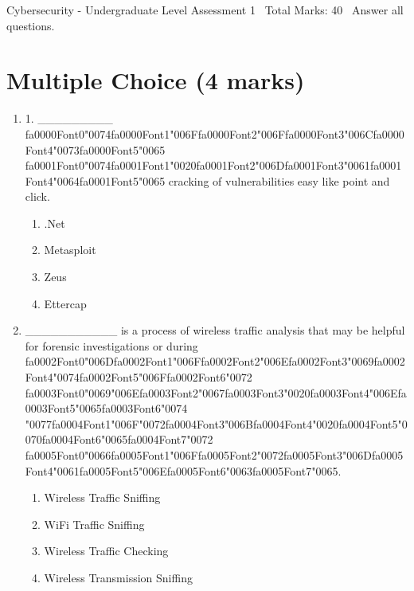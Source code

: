 \documentclass[12pt]{article}
\begin{document}
\begin{center}
Cybersecurity - Undergraduate Level Assessment 1 \
Total Marks: 40 \
Answer all questions.
\end{center}

\section*{Multiple Choice (4 marks)}
\begin{enumerate}[label=\arabic*.]
\item 1. \_\_\_\_\_\_\_\_\_ {\csname fa0000Font0\endcsname\char"0074}{\csname fa0000Font1\endcsname\char"006F}{\csname fa0000Font2\endcsname\char"006F}{\csname fa0000Font3\endcsname\char"006C}{\csname fa0000Font4\endcsname\char"0073}{\csname fa0000Font5\endcsname\char"0065} {\csname fa0001Font0\endcsname\char"0074}{\csname fa0001Font1\endcsname\char"0020}{\csname fa0001Font2\endcsname\char"006D}{\csname fa0001Font3\endcsname\char"0061}{\csname fa0001Font4\endcsname\char"0064}{\csname fa0001Font5\endcsname\char"0065} cracking of vulnerabilities easy like point and click.
\begin{enumerate}[label=(\alph*)]
    \item .Net
    \item Metasploit
    \item Zeus
    \item Ettercap
\end{enumerate}
\item \_\_\_\_\_\_\_\_\_\_\_ is a process of wireless traffic analysis that may be helpful for forensic investigations or during {\csname fa0002Font0\endcsname\char"006D}{\csname fa0002Font1\endcsname\char"006F}{\csname fa0002Font2\endcsname\char"006E}{\csname fa0002Font3\endcsname\char"0069}{\csname fa0002Font4\endcsname\char"0074}{\csname fa0002Font5\endcsname\char"006F}{\csname fa0002Font6\endcsname\char"0072} {\csname fa0003Font0\endcsname\char"0069}{\char"006E}{\csname fa0003Font2\endcsname\char"0067}{\csname fa0003Font3\endcsname\char"0020}{\csname fa0003Font4\endcsname\char"006E}{\csname fa0003Font5\endcsname\char"0065}{\csname fa0003Font6\endcsname\char"0074} {\char"0077}{\csname fa0004Font1\endcsname\char"006F}{\char"0072}{\csname fa0004Font3\endcsname\char"006B}{\csname fa0004Font4\endcsname\char"0020}{\csname fa0004Font5\endcsname\char"0070}{\csname fa0004Font6\endcsname\char"0065}{\csname fa0004Font7\endcsname\char"0072} {\csname fa0005Font0\endcsname\char"0066}{\csname fa0005Font1\endcsname\char"006F}{\csname fa0005Font2\endcsname\char"0072}{\csname fa0005Font3\endcsname\char"006D}{\csname fa0005Font4\endcsname\char"0061}{\csname fa0005Font5\endcsname\char"006E}{\csname fa0005Font6\endcsname\char"0063}{\csname fa0005Font7\endcsname\char"0065}.
\begin{enumerate}[label=(\alph*)]
    \item Wireless Traffic Sniffing
    \item WiFi Traffic Sniffing
    \item Wireless Traffic Checking
    \item Wireless Transmission Sniffing
\end{enumerate}
\end{enumerate}
\end{document}
